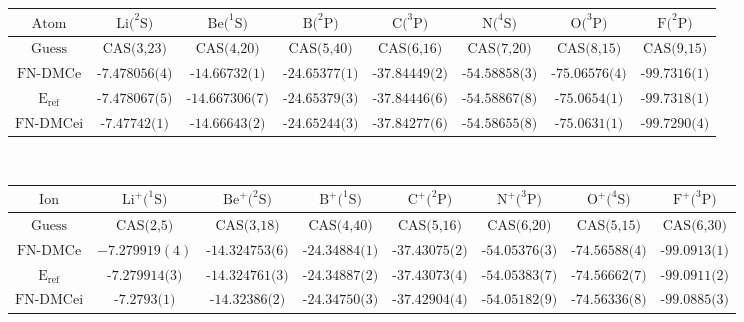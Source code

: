 \documentclass[aps,prl,superscriptaddress,groupedaddress]{revtex4}
\begin{document}
\begin{table*}[htpb!]
\setlength{\extrarowheight}{3pt}
\begin{tabular}{*{1}{*{8}{c}}}
\hline\hline
$\text{Atom}$ & $\text{Li}(^2\text{S)}$ & $\text{Be}(^1\text{S)}$ & $\text{B}(^2\text{P)}$ & $\text{C}(^3\text{P)}$ & $\text{N}(^4\text{S)}$ & $\text{O}(^3\text{P)}$ & $\text{F}(^2\text{P)}$ \\ \hline
$\text{Guess}$ & $\text{CAS(3,23)}$ & $\text{CAS(4,20)}$ & $\text{CAS(5,40)}$ & $\text{CAS(6,16)}$ & $\text{CAS(7,20)}$ & $\text{CAS(8,15)}$ & $\text{CAS(9,15)}$ \\
$\text{FN-DMCe}$ & $\text{-7.478056(4)}$ & $\text{-14.66732(1)}$ & $\text{-24.65377(1)}$ & $\text{-37.84449(2)}$ & $\text{-54.58858(3)}$ & $\text{-75.06576(4)}$ & $\text{-99.7316(1)}$ \\
$\text{E}_\text{ref}$ & $\text{-7.478067(5)}$ & $\text{-14.667306(7)}$ & $\text{-24.65379(3)}$ & $\text{-37.84446(6)}$ & $\text{-54.58867(8)}$ & $\text{-75.0654(1)}$ & $\text{-99.7318(1)}$ \\
$\text{FN-DMCei}$ & $\text{-7.47742(1)}$ & $\text{-14.66643(2)}$ & $\text{-24.65244(3)}$ & $\text{-37.84277(6)}$ & $\text{-54.58655(8)}$ & $\text{-75.0631(1)}$ & $\text{-99.7290(4)}$ \\
\hline
\end{tabular} \\ 
\begin{tabular}{*{1}{*{8}{c}}}
$\text{Ion}$ & $\text{Li}^+(^1\text{S)}$ & $\text{Be}^+(^2\text{S)}$ & $\text{B}^+(^1\text{S)}$ & $\text{C}^+(^2\text{P)}$ & $\text{N}^+(^3\text{P)}$ & $\text{O}^+(^4\text{S)}$ & $\text{F}^+(^3\text{P)}$ \\ \hline
$\text{Guess}$ & $\text{CAS(2,5)}$ & $\text{CAS(3,18)}$ & $\text{CAS(4,40)}$ & $\text{CAS(5,16)}$ & $\text{CAS(6,20)}$ & $\text{CAS(5,15)}$ & $\text{CAS(6,30)}$ \\
$\text{FN-DMCe}$ & $-7.279919(4)$ & $\text{-14.324753(6)}$ & $\text{-24.34884(1)}$ & $\text{-37.43075(2)}$ & $\text{-54.05376(3)}$ & $\text{-74.56588(4)}$ & $\text{-99.0913(1)}$ \\
$\text{E}_{\text{ref}}$ & $\text{-7.279914(3)}$ & $\text{-14.324761(3)}$ & $\text{-24.34887(2)}$ & $\text{-37.43073(4)}$ & $\text{-54.05383(7)}$ & $\text{-74.56662(7)}$ & $\text{-99.0911(2)}$ \\
$\text{FN-DMCei}$ & $\text{-7.2793(1)}$ & $\text{-14.32386(2)}$ & $\text{-24.34750(3)}$ & $\text{-37.42904(4)}$ & $\text{-54.05182(9)}$ & $\text{-74.56336(8)}$ & $\text{-99.0885(3)}$ \\

\end{tabular}
\end{table*}
\end{document}
